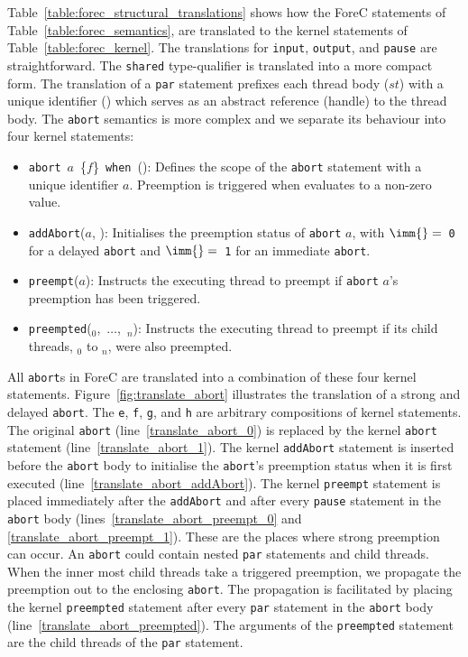 Table~\ref{table:forec_structural_translations} shows how 
the ForeC statements of Table~\ref{table:forec_semantics}, 
are translated to the 
kernel statements of Table~\ref{table:forec_kernel}.
The translations for \verb$input$, \verb$output$, and 
\verb$pause$ are straightforward. The \verb$shared$ type-qualifier
is translated into a more compact form. The translation
of a \verb$par$ statement prefixes each thread body ($st$) 
with a unique identifier (\thread{}) which serves
as an abstract reference (handle) to the thread body.
The \verb$abort$ semantics is more complex and we 
separate its behaviour into four kernel statements:
\begin{itemize}
	\item \verb$abort$~$a$~\{$f$\}~\verb$when$~(\expression{}):
		  Defines the scope of the \verb$abort$ statement
		  with a unique identifier $a$. Preemption is triggered 
		  when \expression{} evaluates to a non-zero value.
	\item \verb$addAbort$($a$, \imm{}):
		  Initialises the preemption status of \verb$abort$ $a$,
		  with $\imm{} =$~\verb$0$ for a delayed \verb$abort$ and 
		  $\imm{} =$~\verb$1$ for an immediate \verb$abort$.
	\item \verb$preempt$($a$):
		  Instructs the executing thread to preempt if  
		  \verb$abort$ $a$'s preemption has been triggered.
	\item \verb$preempted$(\thread{}$_0$,~$\dots$,~\thread{}$_n$):
		  Instructs the executing thread to preempt if its child
		  threads, \thread{}$_0$ to \thread{}$_n$, were also preempted.
\end{itemize}
All \verb$abort$s in ForeC are translated into a combination
of these four kernel statements. Figure~\ref{fig:translate_abort} 
illustrates the translation of a strong and delayed \verb$abort$. 
The \verb$e$, \verb$f$, \verb$g$, and \verb$h$ are arbitrary 
compositions of kernel statements.
The original \verb$abort$ (line~\ref{translate_abort_0}) is replaced 
by the kernel \verb$abort$ statement (line~\ref{translate_abort_1}). 
The kernel \verb$addAbort$ statement is inserted before the 
\verb$abort$ body to initialise the \verb$abort$'s preemption 
status when it is first executed (line~\ref{translate_abort_addAbort}). 
The kernel \verb$preempt$ statement is placed immediately after 
the \verb$addAbort$ and after every \verb$pause$ statement in 
the \verb$abort$ body (lines~\ref{translate_abort_preempt_0} and 
\ref{translate_abort_preempt_1}). These are the places where strong
preemption can occur. 
An \verb$abort$ could contain nested \verb$par$ 
statements and child threads. When the inner 
most child threads take a triggered preemption, 
we propagate the preemption out to the enclosing 
\verb$abort$. The propagation is facilitated by placing 
the kernel \verb$preempted$ statement after every 
\verb$par$ statement in the \verb$abort$ body
(line~\ref{translate_abort_preempted}). The
arguments of the \verb$preempted$ statement are
the child threads of the \verb$par$ statement.


